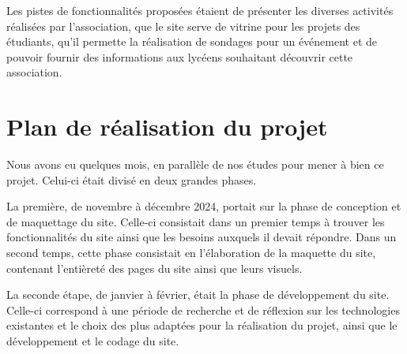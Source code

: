 Les pistes de fonctionnalités proposées étaient de présenter les diverses activités réalisées par l’association, que le site serve de vitrine pour les projets des étudiants, qu'il permette la réalisation de sondages pour un événement et de pouvoir fournir des informations aux lycéens souhaitant découvrir cette association.

\section{Plan de réalisation du projet}

Nous avons eu quelques mois, en parallèle de nos études pour mener à bien ce projet. Celui-ci était divisé en deux grandes phases. 
\bigskip

La première, de novembre à décembre 2024, portait sur la phase de conception et de maquettage du site. Celle-ci consistait dans un premier temps à trouver les fonctionnalités du site ainsi que les besoins auxquels il devait répondre. Dans un second temps, cette phase consistait en l'élaboration de la maquette du site, contenant l'entièreté des pages du site ainsi que leurs visuels. 
\bigskip

La seconde étape, de janvier à février, était la phase de développement du site. Celle-ci correspond à une période de recherche et de réflexion sur les technologies existantes et le choix des plus adaptées pour la réalisation du projet, ainsi que le développement et le codage du site.

